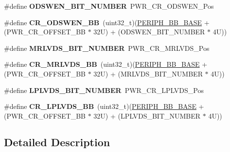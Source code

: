 \begin{DoxyCompactItemize}
\#define {\bfseries O\+D\+S\+W\+E\+N\+\_\+\+B\+I\+T\+\_\+\+N\+U\+M\+B\+ER}~P\+W\+R\+\_\+\+C\+R\+\_\+\+O\+D\+S\+W\+E\+N\+\_\+\+Pos
\item 
\mbox{\label{group___p_w_r_ex__register__alias__address_ga4915f7ce72ac67213c7a5b50bce70d54}} 
\#define {\bfseries C\+R\+\_\+\+O\+D\+S\+W\+E\+N\+\_\+\+BB}~(uint32\+\_\+t)(\mbox{\hyperlink{group___peripheral__memory__map_gaed7efc100877000845c236ccdc9e144a}{P\+E\+R\+I\+P\+H\+\_\+\+B\+B\+\_\+\+B\+A\+SE}} + (P\+W\+R\+\_\+\+C\+R\+\_\+\+O\+F\+F\+S\+E\+T\+\_\+\+BB $\ast$ 32\+U) + (\+O\+D\+S\+W\+E\+N\+\_\+\+B\+I\+T\+\_\+\+N\+U\+M\+B\+E\+R $\ast$ 4\+U))
\item 
\mbox{\label{group___p_w_r_ex__register__alias__address_ga28a0fb2b4631ef67fa151764489fbf24}} 
\#define {\bfseries M\+R\+L\+V\+D\+S\+\_\+\+B\+I\+T\+\_\+\+N\+U\+M\+B\+ER}~P\+W\+R\+\_\+\+C\+R\+\_\+\+M\+R\+L\+V\+D\+S\+\_\+\+Pos
\item 
\mbox{\label{group___p_w_r_ex__register__alias__address_ga07027fcac2bdf595eaf9d0933fbdaeec}} 
\#define {\bfseries C\+R\+\_\+\+M\+R\+L\+V\+D\+S\+\_\+\+BB}~(uint32\+\_\+t)(\mbox{\hyperlink{group___peripheral__memory__map_gaed7efc100877000845c236ccdc9e144a}{P\+E\+R\+I\+P\+H\+\_\+\+B\+B\+\_\+\+B\+A\+SE}} + (P\+W\+R\+\_\+\+C\+R\+\_\+\+O\+F\+F\+S\+E\+T\+\_\+\+BB $\ast$ 32\+U) + (\+M\+R\+L\+V\+D\+S\+\_\+\+B\+I\+T\+\_\+\+N\+U\+M\+B\+E\+R $\ast$ 4\+U))
\item 
\mbox{\label{group___p_w_r_ex__register__alias__address_ga275a1c9f059c6d03973211a12b88311f}} 
\#define {\bfseries L\+P\+L\+V\+D\+S\+\_\+\+B\+I\+T\+\_\+\+N\+U\+M\+B\+ER}~P\+W\+R\+\_\+\+C\+R\+\_\+\+L\+P\+L\+V\+D\+S\+\_\+\+Pos
\item 
\mbox{\label{group___p_w_r_ex__register__alias__address_gadf91aa0d2f93b4cc91f2f6ca82200faf}} 
\#define {\bfseries C\+R\+\_\+\+L\+P\+L\+V\+D\+S\+\_\+\+BB}~(uint32\+\_\+t)(\mbox{\hyperlink{group___peripheral__memory__map_gaed7efc100877000845c236ccdc9e144a}{P\+E\+R\+I\+P\+H\+\_\+\+B\+B\+\_\+\+B\+A\+SE}} + (P\+W\+R\+\_\+\+C\+R\+\_\+\+O\+F\+F\+S\+E\+T\+\_\+\+BB $\ast$ 32\+U) + (\+L\+P\+L\+V\+D\+S\+\_\+\+B\+I\+T\+\_\+\+N\+U\+M\+B\+E\+R $\ast$ 4\+U))
\end{DoxyCompactItemize}


\subsection{Detailed Description}
